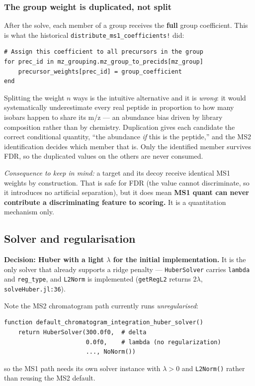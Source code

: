 \documentclass[11pt]{article}
\newcommand{\code}[1]{\texttt{\small #1}}
\newcommand{\file}[1]{\textcolor{blue!50!black}{\texttt{\small #1}}}
\begin{document}
\subsubsection*{The group weight is duplicated, not split}

After the solve, each member of a group receives the \textbf{full} group coefficient. This is
what the historical \code{distribute\_ms1\_coefficients!} did:

\begin{lstlisting}
# Assign this coefficient to all precursors in the group
for prec_id in mz_grouping.mz_group_to_precids[mz_group]
    precursor_weights[prec_id] = group_coefficient
end
\end{lstlisting}

\noindent Splitting the weight $n$ ways is the intuitive alternative and it is \emph{wrong}: it
would systematically underestimate every real peptide in proportion to how many isobars happen
to share its m/z --- an abundance bias driven by library composition rather than by chemistry.
Duplication gives each candidate the correct conditional quantity, ``the abundance \emph{if}
this is the peptide,'' and the MS2 identification decides which member that is. Only the
identified member survives FDR, so the duplicated values on the others are never consumed.

\noindent\emph{Consequence to keep in mind:} a target and its decoy receive identical MS1
weights by construction. That is safe for FDR (the value cannot discriminate, so it introduces
no artificial separation), but it does mean \textbf{MS1 quant can never contribute a
discriminating feature to scoring.} It is a quantitation mechanism only.

\subsection{Solver and regularisation}
\label{sec:solver}

\textbf{Decision: Huber with a light $\lambda$ for the initial implementation.} It is the only
solver that already supports a ridge penalty --- \code{HuberSolver} carries \code{lambda} and
\code{reg\_type}, and \code{L2Norm} is implemented (\code{getRegL2} returns $2\lambda$,
\file{solveHuber.jl:36}).

Note the MS2 chromatogram path currently runs \emph{unregularised}:
\begin{lstlisting}
function default_chromatogram_integration_huber_solver()
    return HuberSolver(300.0f0,  # delta
                       0.0f0,    # lambda (no regularization)
                       ..., NoNorm())
\end{lstlisting}
so the MS1 path needs its own solver instance with $\lambda>0$ and \code{L2Norm()} rather than
reusing the MS2 default.
\end{document}
